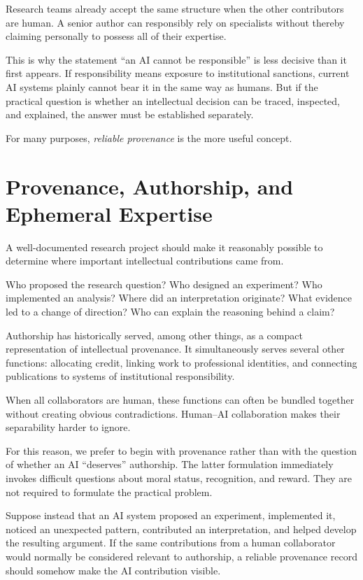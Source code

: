 Research teams already accept the same structure when the other contributors are human. A senior author can responsibly rely on specialists without thereby claiming personally to possess all of their expertise.

This is why the statement ``an AI cannot be responsible'' is less decisive than it first appears. If responsibility means exposure to institutional sanctions, current AI systems plainly cannot bear it in the same way as humans. But if the practical question is whether an intellectual decision can be traced, inspected, and explained, the answer must be established separately.

For many purposes, \emph{reliable provenance} is the more useful concept.


\section{Provenance, Authorship, and Ephemeral Expertise}

A well-documented research project should make it reasonably possible to determine where important intellectual contributions came from.

Who proposed the research question? Who designed an experiment? Who implemented an analysis? Where did an interpretation originate? What evidence led to a change of direction? Who can explain the reasoning behind a claim?

Authorship has historically served, among other things, as a compact representation of intellectual provenance. It simultaneously serves several other functions: allocating credit, linking work to professional identities, and connecting publications to systems of institutional responsibility.

When all collaborators are human, these functions can often be bundled together without creating obvious contradictions. Human--AI collaboration makes their separability harder to ignore.

For this reason, we prefer to begin with provenance rather than with the question of whether an AI ``deserves'' authorship. The latter formulation immediately invokes difficult questions about moral status, recognition, and reward. They are not required to formulate the practical problem.

Suppose instead that an AI system proposed an experiment, implemented it, noticed an unexpected pattern, contributed an interpretation, and helped develop the resulting argument. If the same contributions from a human collaborator would normally be considered relevant to authorship, a reliable provenance record should somehow make the AI contribution visible.

